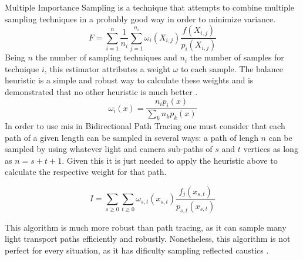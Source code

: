 Multiple Importance Sampling is a technique that attempts to combine multiple sampling techniques in a probably good way in order to minimize variance.
\begin{equation}
F = \sum_{i=1}^n \frac{1}{n_i} \sum_{j=1}^{n_i} \omega_i (X_{i,j}) \frac{f(X_{i,j})}{p_i (X_{i,j})}
\label{eq:mis}
\end{equation}
Being $n$ the number of sampling techniques and $n_i$ the number of samples for technique $i$, this estimator attributes a weight $\omega$ to each sample. The balance heuristic is a simple and robust way to calculate these weights and is demonstrated that no other heuristic is much better \citep[p.~264]{Veach}.
\begin{equation}
\omega_i (x) = \frac{n_i p_i (x)}{\sum _k n_k p_k (x)}
\label{eq:balance}
\end{equation}
In order to use \gls{mis} in Bidirectional Path Tracing one must consider that each path of a given length can be sampled in several ways: a path of lengh $n$ can be sampled by using whatever light and camera sub-paths of $s$ and $t$ vertices as long as $n=s+t+1$. Given this it is just needed to apply the heuristic above to calculate the respective weight for that path.

\begin{equation}
I=\sum_{s \geq 0}\sum_{t \geq 0}\omega_{s,t}(x_{s,t})\frac{f_j (x_{s,t})}{p_{s,t}(x_{s,t})}
\label{eq:bpt}
\end{equation}

This algorithm is much more robust than path tracing, as it can sample many light transport paths efficiently and robustly. Nonetheless, this algorithm is not perfect for every situation, as it has dificulty sampling reflected caustics \citep{Georgiev}.



